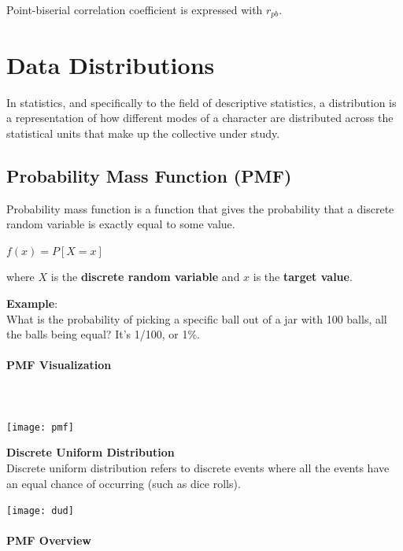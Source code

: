 \documentclass{article}
\begin{document}
Point-biserial correlation coefficient is expressed with $r_{pb}$.

\clearpage

\section{Data Distributions}
In statistics, and specifically to the field of descriptive statistics, a distribution is a representation of how different modes of a character are distributed across the statistical units that make up the collective under study.

\subsection{Probability Mass Function (PMF)}
Probability mass function is a function that gives the probability that a discrete random variable is exactly equal to some value. 

$f(x) = P[X = x]$

where $X$ is the \textbf{discrete random variable} and $x$ is the \textbf{target value}.

\textbf{Example}:\\ 

What is the probability of picking a specific ball out of a jar with 100 balls, all the balls being equal? 
It’s 1/100, or 1\%.

\paragraph{PMF Visualization}\mbox{} \\
\mbox{} \\

\texttt{[image: pmf]}

\textbf{Discrete Uniform Distribution} \\ 
Discrete uniform distribution refers to discrete events where all the events have an equal chance of occurring (such as dice rolls).

\texttt{[image: dud]}

\paragraph{PMF Overview}\mbox{} \\
\end{document}
